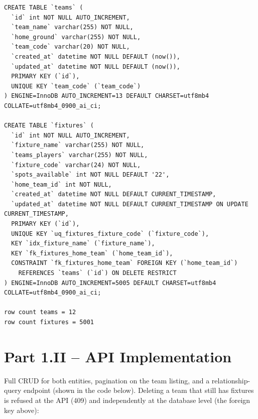 \documentclass[11pt]{article}
\begin{document}
\begin{lstlisting}
CREATE TABLE `teams` (
  `id` int NOT NULL AUTO_INCREMENT,
  `team_name` varchar(255) NOT NULL,
  `home_ground` varchar(255) NOT NULL,
  `team_code` varchar(20) NOT NULL,
  `created_at` datetime NOT NULL DEFAULT (now()),
  `updated_at` datetime NOT NULL DEFAULT (now()),
  PRIMARY KEY (`id`),
  UNIQUE KEY `team_code` (`team_code`)
) ENGINE=InnoDB AUTO_INCREMENT=13 DEFAULT CHARSET=utf8mb4 COLLATE=utf8mb4_0900_ai_ci;

CREATE TABLE `fixtures` (
  `id` int NOT NULL AUTO_INCREMENT,
  `fixture_name` varchar(255) NOT NULL,
  `teams_players` varchar(255) NOT NULL,
  `fixture_code` varchar(24) NOT NULL,
  `spots_available` int NOT NULL DEFAULT '22',
  `home_team_id` int NOT NULL,
  `created_at` datetime NOT NULL DEFAULT CURRENT_TIMESTAMP,
  `updated_at` datetime NOT NULL DEFAULT CURRENT_TIMESTAMP ON UPDATE CURRENT_TIMESTAMP,
  PRIMARY KEY (`id`),
  UNIQUE KEY `uq_fixtures_fixture_code` (`fixture_code`),
  KEY `idx_fixture_name` (`fixture_name`),
  KEY `fk_fixtures_home_team` (`home_team_id`),
  CONSTRAINT `fk_fixtures_home_team` FOREIGN KEY (`home_team_id`)
    REFERENCES `teams` (`id`) ON DELETE RESTRICT
) ENGINE=InnoDB AUTO_INCREMENT=5005 DEFAULT CHARSET=utf8mb4 COLLATE=utf8mb4_0900_ai_ci;

row count teams = 12
row count fixtures = 5001
\end{lstlisting}

\section*{Part 1.II -- API Implementation}

Full CRUD for both entities, pagination on the team listing, and a
relationship-query endpoint (shown in the code below). Deleting a
team that still has fixtures is refused at the API (409) and independently
at the database level (the foreign key above):
\end{document}
